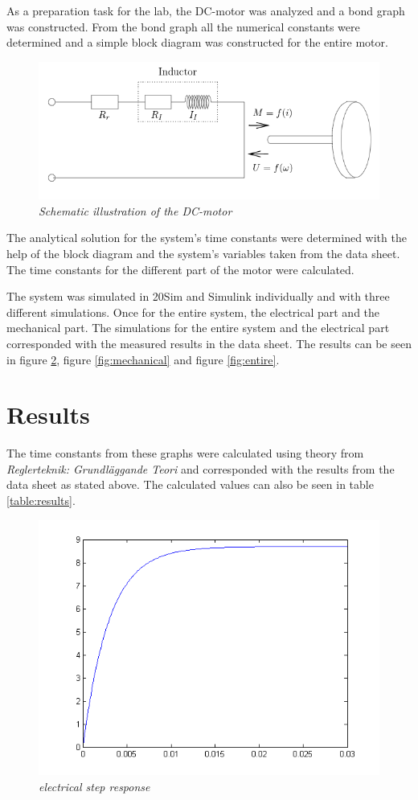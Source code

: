 \documentclass[12pt,a4paper]{article}
\begin{document}
As a preparation task for the lab, the DC-motor was analyzed and a bond graph was constructed. From the bond graph all the numerical constants were determined and a simple block diagram was constructed for the entire motor.
\begin{figure}
  \centering
  \includegraphics[width=1\linewidth]{schematicdcmotor.png}
  \caption{\emph{Schematic illustration of the DC-motor}}
  \label{fig:dcmoto}
\end{figure}
The analytical solution for the system's time constants were determined with the help of the block diagram and the system's variables taken from the data sheet. The time constants for the different part of the motor were calculated.

The system was simulated in 20Sim and Simulink individually and with three different simulations. Once for the entire system, the electrical part and the mechanical part. The simulations for the entire system and the electrical part corresponded with the measured results in the data sheet. The results can be seen in figure \ref{fig:electrical}, figure \ref{fig:mechanical} and figure \ref{fig:entire}.
\section{Results}
The time constants from these graphs were calculated using theory from \textit{Reglerteknik: Grundläggande Teori} \cite{regler} and corresponded with the results from the data sheet as stated above. The calculated values can also be seen in table \ref{table:results}.
\begin{figure}[h!]
  \centering
  \includegraphics[width=.4\linewidth]{electricalsim.png}
  \caption{\emph{electrical step response}}
  \label{fig:electrical}
\end{figure}
\end{document}

